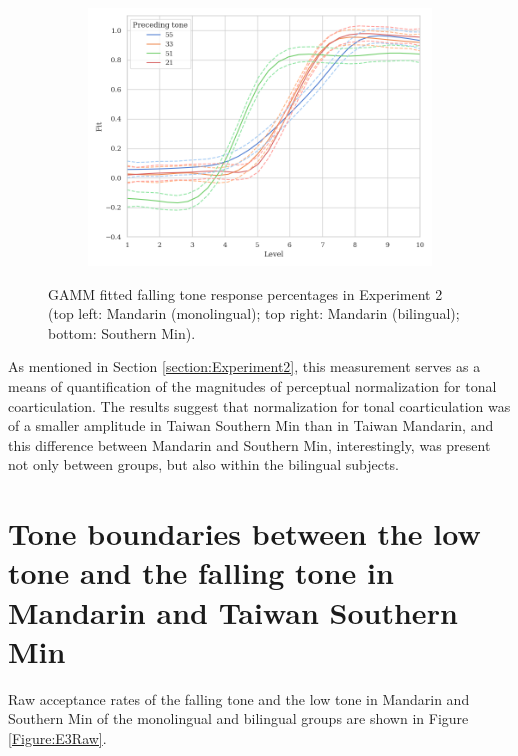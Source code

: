 \begin{figure}[hbt!]
\begin{subfigure}[b]{.45\textwidth}
\includegraphics[width=\textwidth]{figures/E2/Min_GAMM.png}
\end{subfigure}
\caption{GAMM fitted falling tone response percentages in Experiment 2 (top left: Mandarin (monolingual); top right: Mandarin (bilingual); bottom: Southern Min).}
\label{Figure:E2GAMM}
\end{figure}

As mentioned in Section \ref{section:Experiment2}, this measurement serves as a means of quantification of the magnitudes of perceptual normalization for tonal coarticulation. The results suggest that normalization for tonal coarticulation was of a smaller amplitude in Taiwan Southern Min than in Taiwan Mandarin, and this difference between Mandarin and Southern Min, interestingly, was present not only between groups, but also within the bilingual subjects.

\section{Tone boundaries between the low tone and the falling tone in Mandarin and Taiwan Southern Min}

Raw acceptance rates of the falling tone and the low tone in Mandarin and Southern Min of the monolingual and bilingual groups are shown in Figure \ref{Figure:E3Raw}.

